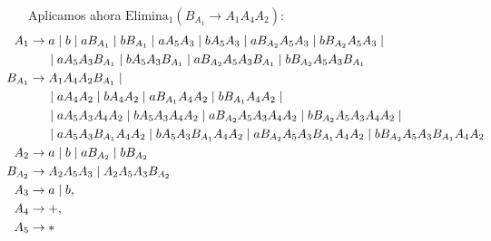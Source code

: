 \documentclass[12pt]{article}
\begin{document}
\begin{ejercicio}[2.5 puntos]
\begin{description}
        Aplicamos ahora $\text{Elimina}_1(B_{A_1}\rightarrow A_1 A_4 A_2)$:
        \begin{align*}
            \hspace{-2.5cm}A_1 &\to  a \mid b\mid a B_{A_1} \mid b B_{A_1}
                \mid  aA_5A_3 \mid bA_5A_3 \mid   a B_{A_2}A_5A_3 \mid  b B_{A_2}A_5A_3
                \mid \\ & \hspace{0.5cm} \mid  aA_5 A_3 B_{A_1} \mid bA_5 A_3 B_{A_1} \mid   a B_{A_2}A_5 A_3 B_{A_1} 
                \mid b B_{A_2}A_5 A_3 B_{A_1} \\
            \hspace{-2.5cm}B_{A_1} &\to A_1 A_4 A_2 B_{A_1}
                \mid \\ & \hspace{0.5cm} \mid  aA_4 A_2 \mid bA_4 A_2\mid a B_{A_1}A_4 A_2 \mid b B_{A_1}A_4 A_2
                \mid \\ & \hspace{0.5cm} \mid  aA_5A_3 A_4 A_2\mid bA_5A_3A_4 A_2 \mid   a B_{A_2}A_5A_3A_4 A_2
                \mid b B_{A_2}A_5A_3A_4 A_2
                \mid \\ & \hspace{0.5cm} \mid  aA_5 A_3 B_{A_1}A_4 A_2 \mid bA_5 A_3 B_{A_1}A_4 A_2
                \mid  a B_{A_2}A_5 A_3 B_{A_1}A_4 A_2 \mid b B_{A_2}A_5 A_3 B_{A_1}A_4 A_2 \\
            \hspace{-2.5cm}A_2 &\to  a \mid b \mid   a B_{A_2} \mid  b B_{A_2} \\
            \hspace{-2.5cm}B_{A_2} & \to A_2 A_5 A_3 \mid A_2 A_5 A_3 B_{A_2}\\
            \hspace{-2.5cm}A_3 &\to  a \mid b,\\
            \hspace{-2.5cm}A_4 &\to +,\\
            \hspace{-2.5cm}A_5 &\to *
        \end{align*}


\end{description}
\end{ejercicio}
\end{document}
